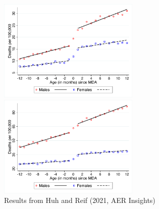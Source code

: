 \documentclass[12pt]{article}
\begin{document}
\medskip
\begin{figure}[htb!]
  \caption{Results from Huh and Reif (2021, AER Insights)}
  \label{fig:huh_reif_2021}
  \begin{center}
    \includegraphics[width = 0.6\textwidth]{rd_mva_male_female.pdf}
  \end{center}

  \begin{center}
    \includegraphics[width = 0.6\textwidth]{rd_any_male_female.pdf}
  \end{center}
\end{figure}
\end{document}
